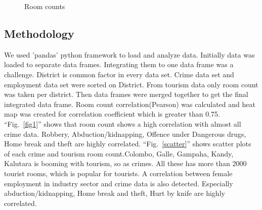 \documentclass[conference]{IEEEtran}
\begin{document}
\begin{figure}[htbp]
    \caption{Room counts}
    \label{fig_rooms}
\end{figure}

\subsection{Methodology}
We used 'pandas' python framework to load and analyze data. Initially data was loaded to separate data frames. Integrating them to one data frame was a challenge. District is common factor in every data set. Crime data set and employment data set were sorted on District. From tourism data only room count was taken per district. Then data frames were merged together to get the final integrated data frame. 
Room count correlation(Pearson) was calculated and heat map was created for correlation coefficient which is greater than 0.75. ``Fig.~\ref{fig1}'' shows that room count shows a high correlation with almost all crime data. Robbery, Abduction/kidnapping, Offence under Dangerous drugs, Home break and theft are highly correlated. ``Fig.~\ref{scatter}'' shows scatter plots of each crime and tourism room count.Colombo, Galle, Gampaha, Kandy, Kalutara is booming with tourism, so as crimes. All these has more than 2000 tourist rooms, which is popular for tourists.
A correlation between female employment in industry sector and crime data is also detected. Especially abduction/kidnapping, Home break and theft, Hurt by knife are highly correlated. 
\end{document}
